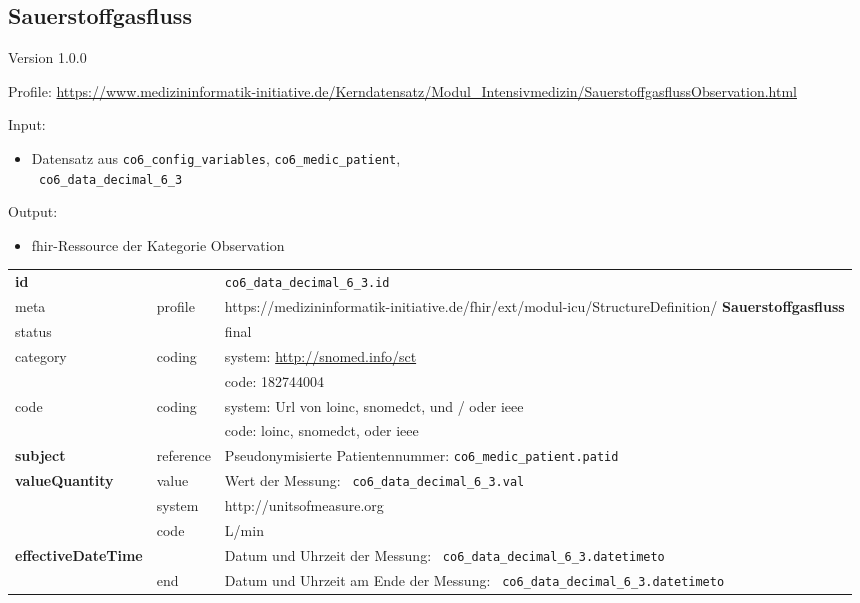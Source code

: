 \subsection{Sauerstoffgasfluss} 
\noindent Version 1.0.0

\noindent Profile: \url{https://www.medizininformatik-initiative.de/Kerndatensatz/Modul_Intensivmedizin/SauerstoffgasflussObservation.html}

\noindent Input:
\begin{itemize}
	\item Datensatz aus \texttt{co6\_config\_variables}, \texttt{co6\_medic\_patient}, \\ \texttt{
co6\_data\_decimal\_6\_3}
\end{itemize}
Output:
\begin{itemize}
        \item \ac{fhir}-Ressource der Kategorie \glqq Observation\grqq{}
\end{itemize}
\begin{longtable}{|l|l|p{7.5cm}|}
        \hline
        \rowcolor{lightgray} \multicolumn{3}{|l|}{Data Mapping (inhaltlich)} \\ \hline
        \textbf{id} &  & \texttt{co6\_data\_decimal\_6\_3.id} \\ \hline
	meta & profile & https://medizininformatik-initiative.de/fhir/ext/modul-icu/StructureDefinition/\textbf{
Sauerstoffgasfluss} \\ \hline 
	status &  & final   \\ \hline 
	category & coding & system: \url{http://snomed.info/sct} \\
\cline{3-3}
	& & code: 182744004 \\ \hline
	code & coding & system: Url von \ac{loinc}, \ac{snomedct}, und / oder \ac{ieee} \\ 
	\cline{3-3} 
	 &  & code: \ac{loinc}, \ac{snomedct}, oder \ac{ieee} \\ \hline
	 \textbf{subject}  & reference & Pseudonymisierte Patientennummer: \texttt{co6\_medic\_patient.patid} \\ \hline
	 \textbf{valueQuantity}  & value & Wert der Messung: \texttt{
co6\_data\_decimal\_6\_3.val} \\
        \cline{2-3}
         & system & http://unitsofmeasure.org \\
         \cline{2-3}
         & code & L/min \\ \hline
     \textbf{effectiveDateTime}  & & Datum und Uhrzeit der Messung: \texttt{
co6\_data\_decimal\_6\_3.datetimeto} \\
    \cline{2-3}
     & end & Datum und Uhrzeit am Ende der Messung: \texttt{
co6\_data\_decimal\_6\_3.datetimeto} \\ \hline
\end{longtable}


